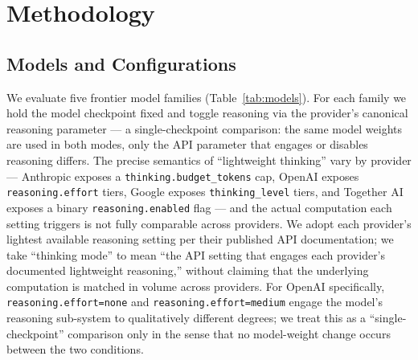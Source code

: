 \documentclass{article}
\begin{document}
\section{Methodology}

\subsection{Models and Configurations}
\label{sec:method-models}
We evaluate five frontier model families (Table~\ref{tab:models}). For each family we hold the model checkpoint fixed and toggle reasoning via the provider's canonical reasoning parameter --- a single-checkpoint comparison: the same model weights are used in both modes, only the API parameter that engages or disables reasoning differs. The precise semantics of ``lightweight thinking'' vary by provider --- Anthropic exposes a \texttt{thinking.budget\_tokens} cap, OpenAI exposes \texttt{reasoning.effort} tiers, Google exposes \texttt{thinking\_level} tiers, and Together AI exposes a binary \texttt{reasoning.enabled} flag --- and the actual computation each setting triggers is not fully comparable across providers. We adopt each provider's lightest available reasoning setting per their published API documentation; we take ``thinking mode'' to mean ``the API setting that engages each provider's documented lightweight reasoning,'' without claiming that the underlying computation is matched in volume across providers. For OpenAI specifically, \texttt{reasoning.effort=none} and \texttt{reasoning.effort=medium} engage the model's reasoning sub-system to qualitatively different degrees; we treat this as a ``single-checkpoint'' comparison only in the sense that no model-weight change occurs between the two conditions.
\end{document}
